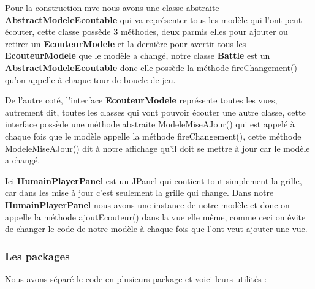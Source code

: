 \documentclass[12pt]{article}
\begin{document}
Pour la construction mvc nous avons une classe abstraite \textbf{AbstractModeleEcoutable} qui va représenter tous les modèle qui l'ont peut écouter, cette classe possède 3 méthodes, deux parmis elles pour ajouter ou retirer un \textbf{EcouteurModele} et la dernière pour avertir tous les \textbf{EcouteurModele} que le modèle a changé, notre classe \textbf{Battle} est un \textbf{AbstractModeleEcoutable} donc elle possède la méthode fireChangement() qu'on appelle à chaque tour de boucle de jeu.

De l'autre coté, l'interface \textbf{EcouteurModele} représente toutes les vues, autrement dit, toutes les classes qui vont pouvoir écouter une autre classe, cette interface possède une méthode abstraite ModeleMiseAJour() qui est appelé à chaque fois que le modèle appelle la méthode fireChangement(), cette méthode ModeleMiseAJour() dit à notre affichage qu'il doit se mettre à jour car le modèle a changé.

Ici \textbf{HumainPlayerPanel} est un JPanel qui contient tout simplement la grille, car dans les mise à jour c'est seulement la grille qui change.
Dans notre \textbf{HumainPlayerPanel} nous avons une instance de notre modèle et donc on appelle la méthode ajoutEcouteur() dans la vue elle même, comme ceci on évite de changer le code de notre modèle à chaque fois que l'ont veut ajouter une vue.

\newpage	

\subsubsection{Les packages}
Nous avons séparé le code en plusieurs package et voici leurs utilités :
\end{document}
